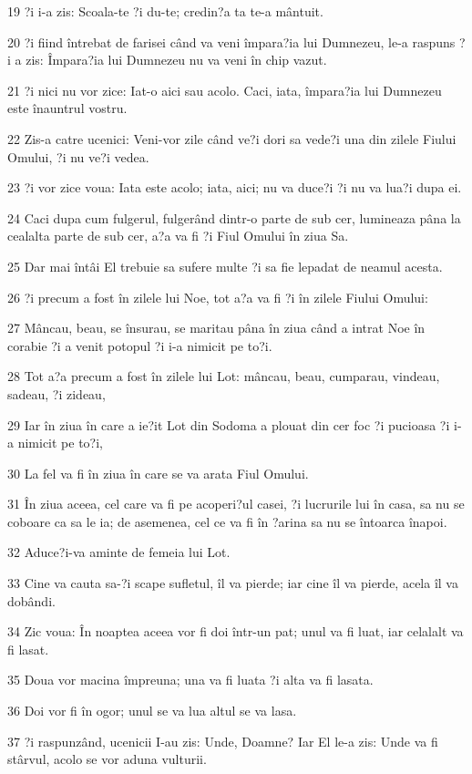 \par 19 ?i i-a zis: Scoala-te ?i du-te; credin?a ta te-a mântuit.
\par 20 ?i fiind întrebat de farisei când va veni împara?ia lui Dumnezeu, le-a raspuns ?i a zis: Împara?ia lui Dumnezeu nu va veni în chip vazut.
\par 21 ?i nici nu vor zice: Iat-o aici sau acolo. Caci, iata, împara?ia lui Dumnezeu este înauntrul vostru.
\par 22 Zis-a catre ucenici: Veni-vor zile când ve?i dori sa vede?i una din zilele Fiului Omului, ?i nu ve?i vedea.
\par 23 ?i vor zice voua: Iata este acolo; iata, aici; nu va duce?i ?i nu va lua?i dupa ei.
\par 24 Caci dupa cum fulgerul, fulgerând dintr-o parte de sub cer, lumineaza pâna la cealalta parte de sub cer, a?a va fi ?i Fiul Omului în ziua Sa.
\par 25 Dar mai întâi El trebuie sa sufere multe ?i sa fie lepadat de neamul acesta.
\par 26 ?i precum a fost în zilele lui Noe, tot a?a va fi ?i în zilele Fiului Omului:
\par 27 Mâncau, beau, se însurau, se maritau pâna în ziua când a intrat Noe în corabie ?i a venit potopul ?i i-a nimicit pe to?i.
\par 28 Tot a?a precum a fost în zilele lui Lot: mâncau, beau, cumparau, vindeau, sadeau, ?i zideau,
\par 29 Iar în ziua în care a ie?it Lot din Sodoma a plouat din cer foc ?i pucioasa ?i i-a nimicit pe to?i,
\par 30 La fel va fi în ziua în care se va arata Fiul Omului.
\par 31 În ziua aceea, cel care va fi pe acoperi?ul casei, ?i lucrurile lui în casa, sa nu se coboare ca sa le ia; de asemenea, cel ce va fi în ?arina sa nu se întoarca înapoi.
\par 32 Aduce?i-va aminte de femeia lui Lot.
\par 33 Cine va cauta sa-?i scape sufletul, îl va pierde; iar cine îl va pierde, acela îl va dobândi.
\par 34 Zic voua: În noaptea aceea vor fi doi într-un pat; unul va fi luat, iar celalalt va fi lasat.
\par 35 Doua vor macina împreuna; una va fi luata ?i alta va fi lasata.
\par 36 Doi vor fi în ogor; unul se va lua altul se va lasa.
\par 37 ?i raspunzând, ucenicii I-au zis: Unde, Doamne? Iar El le-a zis: Unde va fi stârvul, acolo se vor aduna vulturii.

